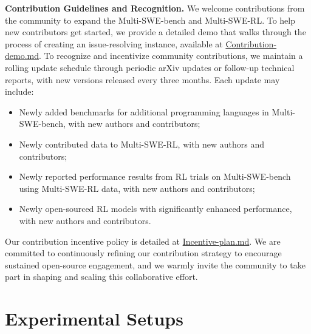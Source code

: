\documentclass[11pt, a4paper, logo, copyright, nonumbering]{seed}
\newcommand{\multiswebench}{Multi-SWE-bench\xspace}
\newcommand{\multiswerl}{Multi-SWE-RL\xspace}
\begin{document}
\noindent
\textbf{Contribution Guidelines and Recognition.}
We welcome contributions from the community to expand the \multiswebench and \multiswerl.
To help new contributors get started, we provide a detailed demo that walks through the process of creating an issue-resolving instance, available at
\href{https://github.com/multi-swe-bench/multi-swe-bench/blob/main/docs/contribution-demo.md}{Contribution-demo.md}.
To recognize and incentivize community contributions, we maintain a rolling update schedule through periodic arXiv updates or follow-up technical reports, with new versions released every three months.
Each update may include:
\begin{itemize}
  \item Newly added benchmarks for additional programming languages in \multiswebench, with new authors and contributors;
  \item Newly contributed data to \multiswerl, with new authors and contributors;
  \item Newly reported performance results from RL trials on \multiswebench using \multiswerl data, with new authors and contributors;
  \item Newly open-sourced RL models with significantly enhanced performance, with new authors and contributors.
\end{itemize}
Our contribution incentive policy is detailed at \href{https://github.com/multi-swe-bench/multi-swe-bench/blob/main/docs/contribution-incentive-plan.md}{Incentive-plan.md}.
We are committed to continuously refining our contribution strategy to encourage sustained open-source engagement, and we warmly invite the community to take part in shaping and scaling this collaborative effort.


\section{Experimental Setups}
\end{document}
